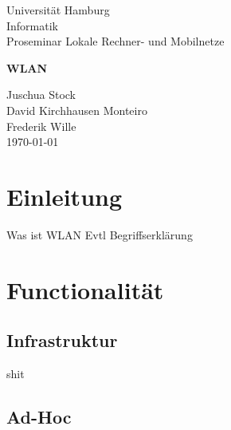 \documentclass[a4paper,12pt]{scrartcl}
\begin{document}
\begin{titlepage}
\begin{small}
\vfill {Universität Hamburg \\ Informatik \\ Proseminar Lokale Rechner- und Mobilnetze }
\end{small}


\begin{center}
\begin{Large}
\vfill {\textsf{\textbf{
WLAN
}}}
\end{Large}
\end{center}

\begin{small}
\vfill Juschua Stock \\ David Kirchhausen Monteiro \\ Frederik Wille \\
\today
\end{small}

\end{titlepage}


\tableofcontents
\thispagestyle{empty}

\clearpage

\onehalfspacing

\pagestyle{plain}


\section{Einleitung}

Was ist WLAN
Evtl Begriffserklärung



\section{Functionalität}

\subsection{Infrastruktur}

shit

\subsection{Ad-Hoc}
\end{document}
